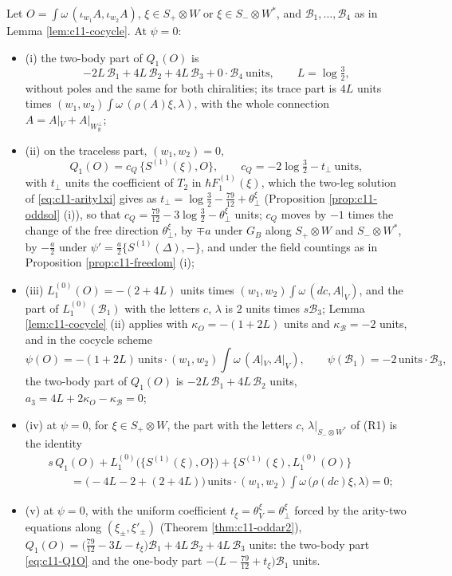 \begin{theorem}
\label{thm:c11-bilinears}
Let $O=\int\omega\,(\iota_{w_1}A,\iota_{w_2}A)$, $\xi\in S_+\otimes W$ or $\xi\in S_-\otimes W^*$, and $\mathcal B_1,\dots,\mathcal B_4$ as in Lemma \ref{lem:c11-cocycle}. At $\psi=0$:
\begin{itemize}
\item (i) the two-body part of $Q_1(O)$ is
\begin{equation}
-2L\,\mathcal B_1+4L\,\mathcal B_2+4L\,\mathcal B_3+0\cdot\mathcal B_4\ \text{units},\qquad L=\log\tfrac32,
\label{eq:c11-Q1O}
\end{equation}
without poles and the same for both chiralities; its trace part is $4L$ units times $(w_1,w_2)\int\omega\,(\rho(A)\xi,\lambda)$, with the whole connection $A=A|_V+A|_{W_{\mathbb R}^\perp}$;
\item (ii) on the traceless part, $(w_1,w_2)=0$,
\[
Q_1(O)=c_Q\,\{S^{(1)}(\xi),O\},\qquad c_Q=-2\log\tfrac32-t_\perp\ \text{units},
\]
with $t_\perp$ units the coefficient of $T_2$ in $\hbar F_1^{(1)}(\xi)$, which the two-leg solution of \eqref{eq:c11-arity1xi} gives as $t_\perp=\log\tfrac32-\tfrac{79}{12}+\theta^\xi_\perp$ (Proposition \ref{prop:c11-oddsol} (i)), so that $c_Q=\tfrac{79}{12}-3\log\tfrac32-\theta^\xi_\perp$ units; $c_Q$ moves by $-1$ times the change of the free direction $\theta^\xi_\perp$, by $\mp a$ under $G_B$ along $S_+\otimes W$ and $S_-\otimes W^*$, by $-\tfrac a2$ under $\psi'=\tfrac a2\{S^{(1)}(\Delta),-\}$, and under the field countings as in Proposition \ref{prop:c11-freedom} (i);
\item (iii) $L_1^{(0)}(O)=-(2+4L)$ units times $(w_1,w_2)\int\omega\,(dc,A|_V)$, and the part of $L_1^{(0)}(\mathcal B_1)$ with the letters $c$, $\lambda$ is $2$ units times $s\mathcal B_3$; Lemma \ref{lem:c11-cocycle} (ii) applies with $\kappa_O=-(1+2L)$ units and $\kappa_{\mathcal B}=-2$ units, and in the cocycle scheme
\[
\psi(O)=-(1+2L)\,\text{units}\cdot(w_1,w_2)\int\omega\,(A|_V,A|_V),\qquad \psi(\mathcal B_1)=-2\,\text{units}\cdot\mathcal B_3,
\]
the two-body part of $Q_1(O)$ is $-2L\,\mathcal B_1+4L\,\mathcal B_2$ units, $a_3=4L+2\kappa_O-\kappa_{\mathcal B}=0$;
\item (iv) at $\psi=0$, for $\xi\in S_+\otimes W$, the part with the letters $c$, $\lambda|_{S_-\otimes W^*}$ of (R1) is the identity
\[
\begin{aligned}
&s\,Q_1(O)+L_1^{(0)}\big(\{S^{(1)}(\xi),O\}\big)+\big\{S^{(1)}(\xi),L_1^{(0)}(O)\big\}\\
&\qquad=\big(-4L-2+(2+4L)\big)\,\text{units}\cdot(w_1,w_2)\int\omega\,\big(\rho(dc)\xi,\lambda\big)=0 ;
\end{aligned}
\]
\item (v) at $\psi=0$, with the uniform coefficient $t_\xi=\theta^\xi_V=\theta^\xi_\perp$ forced by the arity-two equations along $(\xi_\pm,\xi'_\pm)$ (Theorem \ref{thm:c11-oddar2}), $Q_1(O)=\big(\tfrac{79}{12}-3L-t_\xi\big)\mathcal B_1+4L\,\mathcal B_2+4L\,\mathcal B_3$ units: the two-body part \eqref{eq:c11-Q1O} and the one-body part $-\big(L-\tfrac{79}{12}+t_\xi\big)\mathcal B_1$ units.
\end{itemize}
\end{theorem}

